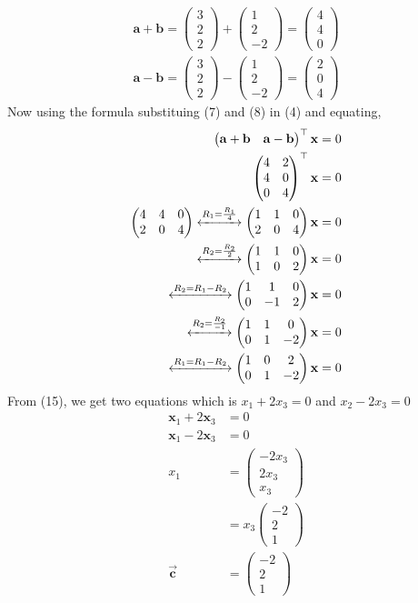 \documentclass[12pt]{article}
\newcommand{\myvec}[1]{\ensuremath{\begin{pmatrix}#1\end{pmatrix}}}
\let\vec\mathbf
\begin{document}
\begin{enumerate}
\begin{align}
\vec{a+b}=\myvec{3\\2\\2}+\myvec{1\\2\\-2}=\myvec{4\\4\\0}\label{7}\\
\vec{a-b}=\myvec{3\\2\\2}-\myvec{1\\2\\-2}=\myvec{2\\0\\4}\label{8}
\end{align}
Now using the formula substituing (7) and (8) in (4) and equating,
\begin{align}
\myvec{\vec{a}+\vec{b}& \vec{a}-\vec{b}}^\top\vec{x}&=0\\
\myvec{
4&2\\
4&0\\
0&4
}^\top \vec{x}&=0\\
\myvec{
4&4&0\\
2&0&4
}
\xleftrightarrow[]{R_1=\frac{R_1}{4}}
\myvec{
1&1&0\\
2&0&4
}\vec{x}&=0\\\xleftrightarrow[]{R_2=\frac{R_2}{2}}
\myvec{
1&1&0\\
1&0&2
}\vec{x}&=0\\
\xleftrightarrow[]{R_2={R_1}-{R_2}}
\myvec{
1&1&0\\
0&-1&2
}\vec{x}&=0\\
\xleftrightarrow[]{R_2=\frac{R_2}{-1}}
\myvec{
1&1&0\\
0&1&-2
}\vec{x}&=0\\
\xleftrightarrow[]{R_1={R_1}-{R_2}}
\myvec{
1&0&2\\
0&1&-2
}\vec{x}&=0
\end{align}
From (15), we get two equations which is $x_1+2x_3=0$ and $x_2-2x_3=0$
\begin{align}
\vec{x}_1+2\vec{x}_3&=0\\
\vec{x}_1-2\vec{x}_3&=0\\
x_1&=\myvec{-2x_3\\2x_3\\x_3}\\
&=x_3\myvec{-2\\2\\1}\\
\overrightarrow{\vec{c}}&=\myvec{-2\\2\\1}

\end{align}
\end{enumerate}
\end{document}
